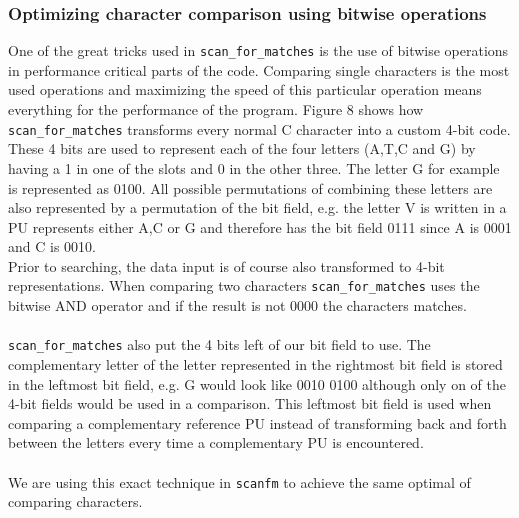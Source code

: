 \documentclass[12pt]{article}
\newcommand{\scm}{\texttt{scan\_for\_matches} }
\newcommand{\sfm}{\texttt{scanfm} }
\newcommand{\pu}{PU }
\begin{document}
\subsubsection{Optimizing character comparison using bitwise operations}
One of the great tricks used in \scm is the use of bitwise operations in performance critical parts of the code.
Comparing single characters is the most used operations and maximizing the speed of this particular operation 
means everything for the performance of the program. Figure 8 shows how \scm transforms every normal C character into
a custom 4-bit code. These 4 bits are used to represent each of the four letters (A,T,C and G) by having a 1 in one of
the slots and 0 in the other three. The letter G for example is represented as 0100. All possible permutations of 
combining these letters are also represented by a permutation of the bit field, e.g. the letter V is written in a \pu 
represents either A,C or G and therefore has the bit field 0111 since A is 0001 and C is 0010. \\
Prior to searching, the data input is of course also transformed to 4-bit representations.
When comparing two characters \scm uses the bitwise AND operator and if the result is not 0000 the characters matches. \\ \\
\scm also put the 4 bits left of our bit field to use. The complementary letter of the letter represented in the rightmost
bit field is stored in the leftmost bit field, e.g. G would look like 0010 0100 although only on of the 4-bit fields would
be used in a comparison. This leftmost bit field is used when comparing a complementary reference \pu instead
of transforming back and forth between the letters every time a complementary \pu is encountered. \\ \\
We are using this exact technique in \sfm to achieve the same optimal of comparing characters.
\end{document}
